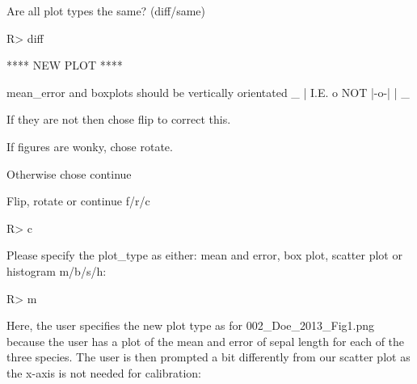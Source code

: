 \documentclass[article]{jss}
\begin{document}
\begin{CodeChunk}
\begin{CodeOutput}
Are all plot types the same? (diff/same) 
\end{CodeOutput}
\begin{CodeInput}
R> diff
\end{CodeInput}
\begin{CodeOutput}
**** NEW PLOT ****

mean_error and boxplots should be vertically orientated
       _ 
       |  
  I.E. o    NOT  |-o-|
       |
       _

If they are not then chose flip to correct this.

If figures are wonky, chose rotate.

Otherwise chose continue

Flip, rotate or continue f/r/c 
\end{CodeOutput}
\begin{CodeInput}
R> c
\end{CodeInput}
\begin{CodeOutput}
Please specify the plot_type as either: mean and error, box plot,
scatter plot or histogram m/b/s/h: 
\end{CodeOutput}
\begin{CodeInput}
R> m
\end{CodeInput}
\end{CodeChunk}

Here, the user specifies the new plot type as  for 002\_Doe\_2013\_Fig1.png because the user has a plot of the mean and error of sepal length for each of the three species. The user is then prompted a bit differently from our scatter plot as the x-axis is not needed for calibration:
\end{document}
